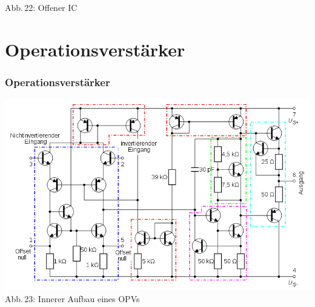 \begin{frame}
\begin{minipage}{0.5\textwidth}
\begin{center}
      {\tiny Abb.\,22: Offener IC~\cite{wpen}}
    \end{center}
  \end{minipage}
\end{frame}

\section*{Operations\-verstärker}

\begin{frame}
  \frametitle{Operationsverstärker}
  \begin{center}
    \includegraphics[width=\textwidth,height=.85\textheight,keepaspectratio]{a06/OPV-intern.png}\\
    {\tiny Abb.\,23: Innerer Aufbau eines OPVs~\cite{wp}}
  \end{center}
\end{frame}

